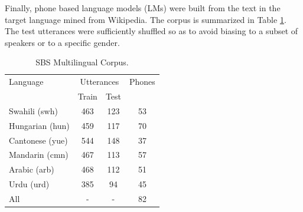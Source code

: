 \documentclass[a4paper]{article}
\begin{document}
Finally, phone based language models (LMs) were built from the text in the target language mined from Wikipedia. The corpus is summarized in Table \ref{Tab:Turkish and English Phoneme Set}. The test utterances were sufficiently shuffled so as to avoid biasing to a subset of speakers or to a specific gender.
\begin{table}
\begin{center}
\caption{SBS Multilingual Corpus.}
\label{Tab:Turkish and English Phoneme Set}
\vspace{-3mm}
\begin{tabular}{l|c c| c}
   \hline
Language &  \multicolumn{2}{c|}{Utterances}  & Phones \\ 
                 &  Train & Test &  \\ \hline
Swahili (swh)     & 463 & 123 & 53 \\ 
Hungarian (hun)    & 459 & 117 & 70 \\ 
Cantonese (yue)  & 544 & 148 &  37 \\ 
Mandarin (cmn) & 467 & 113 &  57 \\ 
Arabic (arb) & 468 & 112 &  51 \\ 
Urdu (urd) & 385 & 94 &  45 \\ \hline
All & - & - & 82 \\ \hline
\end{tabular}
\vspace{-5mm}
\end{center}
\end{table}
\end{document}
